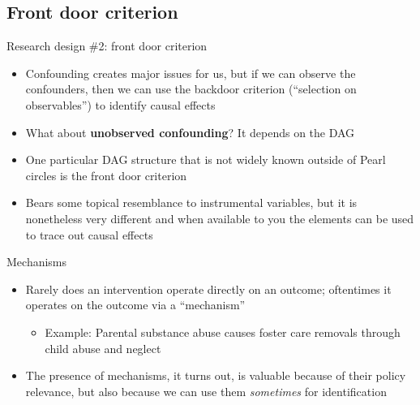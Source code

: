 \documentclass{beamer}
\begin{document}
\subsection{Front door criterion}

\begin{frame}{Research design \#2: front door criterion}

  \begin{itemize}
    \item Confounding creates major issues for us, but if we can observe the confounders, then we can use the backdoor criterion (``selection on observables'') to identify causal effects
    \item What about \textbf{unobserved confounding}?  It depends on the DAG
    \item One particular DAG structure that is not widely known outside of Pearl circles is the front door criterion
    \item Bears some topical resemblance to instrumental variables, but it is nonetheless very different and when available to you the elements can be used to trace out causal effects
  \end{itemize}

\end{frame}

\begin{frame}{Mechanisms}

  \begin{itemize}
    \item Rarely does an intervention operate directly on an outcome; oftentimes it operates on the outcome via a ``mechanism''
          \begin{itemize}
            \item Example: Parental substance abuse causes foster care removals through child abuse and neglect
          \end{itemize}
    \item The presence of mechanisms, it turns out, is valuable because of their policy relevance, but also because we can use them \emph{sometimes} for identification
  \end{itemize}

\end{frame}
\end{document}
